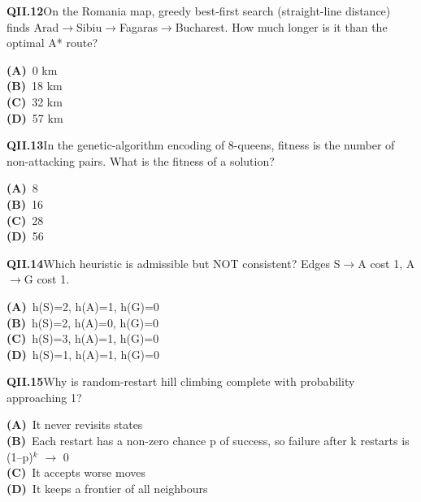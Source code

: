 \begin{tcolorbox}[enhanced,breakable,colback=white,colframe=navyL,arc=2mm,boxrule=0.7pt,left=3mm,right=3mm,top=2mm,bottom=2mm]
\textbf{\color{navy}QII.12}\quad On the Romania map, greedy best-first search (straight-line distance) finds Arad$\to$Sibiu$\to$Fagaras$\to$Bucharest. How much longer is it than the optimal A* route?\hfill{}\par\smallskip
{\small \textbf{\color{navyL}(A)}\ 0 km\\[1pt]\textbf{\color{navyL}(B)}\ 18 km\\[1pt]\textbf{\color{navyL}(C)}\ 32 km\\[1pt]\textbf{\color{navyL}(D)}\ 57 km}
\end{tcolorbox}
\begin{tcolorbox}[enhanced,breakable,colback=white,colframe=navyL,arc=2mm,boxrule=0.7pt,left=3mm,right=3mm,top=2mm,bottom=2mm]
\textbf{\color{navy}QII.13}\quad In the genetic-algorithm encoding of 8-queens, fitness is the number of non-attacking pairs. What is the fitness of a solution?\hfill{}\par\smallskip
{\small \textbf{\color{navyL}(A)}\ 8\\[1pt]\textbf{\color{navyL}(B)}\ 16\\[1pt]\textbf{\color{navyL}(C)}\ 28\\[1pt]\textbf{\color{navyL}(D)}\ 56}
\end{tcolorbox}
\begin{tcolorbox}[enhanced,breakable,colback=white,colframe=navyL,arc=2mm,boxrule=0.7pt,left=3mm,right=3mm,top=2mm,bottom=2mm]
\textbf{\color{navy}QII.14}\quad Which heuristic is admissible but NOT consistent? Edges S$\to$A cost 1, A$\to$G cost 1.\hfill{}\par\smallskip
{\small \textbf{\color{navyL}(A)}\ h(S)=2, h(A)=1, h(G)=0\\[1pt]\textbf{\color{navyL}(B)}\ h(S)=2, h(A)=0, h(G)=0\\[1pt]\textbf{\color{navyL}(C)}\ h(S)=3, h(A)=1, h(G)=0\\[1pt]\textbf{\color{navyL}(D)}\ h(S)=1, h(A)=1, h(G)=0}
\end{tcolorbox}
\begin{tcolorbox}[enhanced,breakable,colback=white,colframe=navyL,arc=2mm,boxrule=0.7pt,left=3mm,right=3mm,top=2mm,bottom=2mm]
\textbf{\color{navy}QII.15}\quad Why is random-restart hill climbing complete with probability approaching 1?\hfill{}\par\smallskip
{\small \textbf{\color{navyL}(A)}\ It never revisits states\\[1pt]\textbf{\color{navyL}(B)}\ Each restart has a non-zero chance p of success, so failure after k restarts is (1--p)$^k$ $\to$ 0\\[1pt]\textbf{\color{navyL}(C)}\ It accepts worse moves\\[1pt]\textbf{\color{navyL}(D)}\ It keeps a frontier of all neighbours}
\end{tcolorbox}
\newpage
